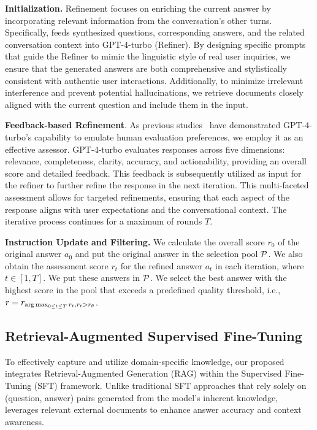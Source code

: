 \textbf{Initialization.} Refinement focuses on enriching the current answer by incorporating relevant information from the conversation's other turns. Specifically, \ourmodel feeds synthesized questions, corresponding answers, and the related conversation context into GPT-4-turbo (Refiner). By designing specific prompts that guide the Refiner to mimic the linguistic style of real user inquiries, we ensure that the generated answers are both comprehensive and stylistically consistent with authentic user interactions. Additionally, to minimize irrelevant interference and prevent potential hallucinations, we retrieve documents closely aligned with the current question and include them in the input.

\textbf{Feedback-based Refinement}. As previous studies~\cite{zheng2024judging,mao2023gpteval} have demonstrated GPT-4-turbo's capability to emulate human evaluation preferences, we employ it as an effective assessor. GPT-4-turbo evaluates responses across five dimensions: relevance, completeness, clarity, accuracy, and actionability, providing an overall score and detailed feedback. This feedback is subsequently utilized as input for the refiner to further refine the response in the next iteration. This multi-faceted assessment allows for targeted refinements, ensuring that each aspect of the response aligns with user expectations and the conversational context. The iterative process continues for a maximum of rounds $T$.


\textbf{Instruction Update and Filtering.} We calculate the overall score $r_0$ of the original answer $a_0$ and put the original answer in the selection pool $\mathcal{P}$. We also obtain the assessment score $r_t$ for the refined answer $a_t$ in each iteration, where $t\in[1,T]$. We put these answers in $\mathcal{P}$. We select the best answer with the highest score in the pool that exceeds a predefined quality threshold, i.e., $r = r_{\arg\max_{0 \leq t\leq T}r_t,r_t> r_{\theta}}$. 



\subsection{Retrieval-Augmented Supervised Fine-Tuning}
To effectively capture and utilize domain-specific knowledge, our proposed \ourmodel integrates Retrieval-Augmented Generation (RAG) within the Supervised Fine-Tuning (SFT) framework. Unlike traditional SFT approaches that rely solely on (question, answer) pairs generated from the model's inherent knowledge, \ourmodel leverages relevant external documents to enhance answer accuracy and context awareness.

